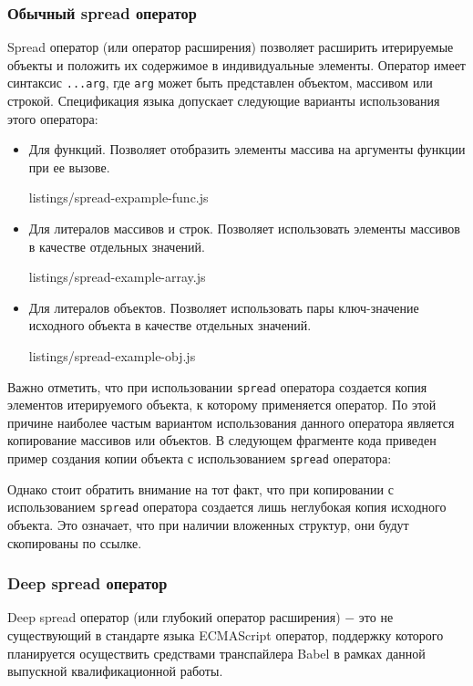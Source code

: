 \documentclass[14pt, a4paper]{article}
\def\code#1{\texttt{#1}} %
\begin{document}
\subsubsection{Обычный spread оператор}
Spread оператор (или оператор расширения)\cite{spread_mozilla} позволяет расширить итерируемые объекты и положить их 
содержимое в индивидуальные элементы. Оператор имеет синтаксис \code{...arg}, где 
\code{arg} может быть представлен объектом, массивом или строкой. Спецификация языка допускает следующие 
варианты использования этого оператора:
\begin{itemize}
  \item {Для функций. Позволяет отобразить элементы массива на аргументы функции при ее вызове.}
  
    {listings/spread-expample-func.js}
  \item {Для литералов массивов и строк. Позволяет использовать элементы массивов в качестве отдельных значений.}
  
    {listings/spread-example-array.js}
  \item {Для литералов объектов. Позволяет использовать пары ключ-значение исходного объекта в качестве отдельных значений.}
  
    {listings/spread-example-obj.js}
\end{itemize}
Важно отметить, что при использовании \code{spread} оператора создается копия элементов 
итерируемого объекта, к которому применяется оператор. По этой причине наиболее частым вариантом 
использования данного оператора является копирование массивов или объектов. В следующем фрагменте 
кода приведен пример создания копии объекта с использованием \code{spread} оператора:

Однако стоит обратить внимание на тот факт, что при копировании с использованием \code{spread} оператора
создается лишь неглубокая копия исходного объекта. Это означает, что при наличии вложенных структур, 
они будут скопированы по ссылке. 

\subsubsection{Deep spread оператор}
Deep spread оператор (или глубокий оператор расширения) $-$ это не существующий в стандарте языка ECMAScript оператор, поддержку которого 
планируется осуществить средствами транспайлера Babel в рамках данной выпускной квалификационной работы.
\end{document}
